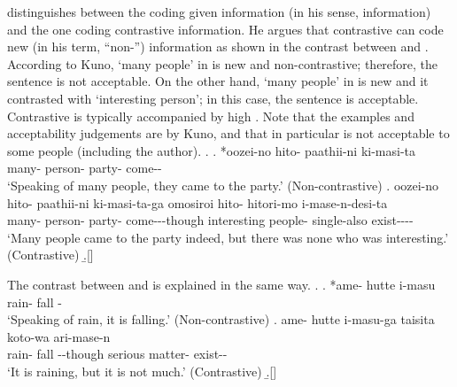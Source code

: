  distinguishes between the  coding given information (in his sense,  information)
and the one coding contrastive information.
He argues that contrastive  can code new (in his term, ``non-'') information
as shown in the contrast between \Next[a] and \Next[b].
According to Kuno,
 `many people' in \Next[a] is new and non-con\-tras\-tive;
therefore, the sentence is not acceptable.
On the other hand,  `many people' in \Next[b] is new and it contrasted with  `interesting person';
in this case, the sentence is acceptable.
Contrastive  is typically accompanied by high .
Note that the examples and acceptability judgements are by Kuno, and that
in particular \Next[b] is not acceptable to some people (including the author).
%
\ex.
 \ag. *oozei-no hito- paathii-ni ki-masi-ta \\
       many- person- party- come-- \\
       `Speaking of many people, they came to the party.'
       \hfill{(Non-contrastive)}
 \bg. oozei-no hito- paathii-ni ki-masi-ta-ga omosiroi hito- hitori-mo i-mase-n-desi-ta \\
       many- person- party- come---though interesting people- single-also exist---- \\
       `Many people came to the party indeed, but there was none who was interesting.'
       \hfill{(Contrastive)}
 \b.[] \hfill{\cite[47]{kuno73}}

The contrast between \Next[a] and \Next[b] is explained in the same way.
\ex.
 \ag. *ame- hutte i-masu \\
       rain- fall - \\
       `Speaking of rain, it is falling.'
       \hfill{(Non-contrastive)}
 \bg. ame- hutte i-masu-ga taisita koto-wa ari-mase-n \\
       rain- fall --though serious matter- exist-- \\
       `It is raining, but it is not much.'
       \hfill{(Contrastive)}
 \b.[] \hfill{\cite[46]{kuno73}}
%

